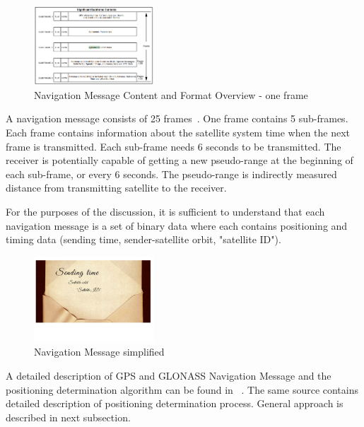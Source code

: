 \documentclass[a4paper,twoside,12pt]{memoir} %
\begin{document}
	\begin{figure}[H]
		\centering
		\includegraphics[width=0.4\textwidth]{NACONTENT}
		\caption{Navigation Message Content and Format Overview - one frame \cite{GPS:1}}
		\label{Fig:aaa}
	\end{figure}
	
	A navigation message consists of 25 frames~\cite{bookProcessing}.
	One frame contains 5 sub-frames.
	Each frame contains information about the satellite system time when the next frame is transmitted. 
	Each sub-frame needs 6 seconds to be transmitted.
	The receiver is potentially capable of getting a new pseudo-range at the beginning of each sub-frame, or every 6 
	seconds. 
	The pseudo-range is indirectly measured distance from transmitting satellite to the receiver.
	
	For the purposes of the discussion, it is sufficient to understand that each navigation message is a set of 
	binary data where each contains positioning and timing data (sending time, sender-satellite orbit, "satellite ID").
	\begin{figure}[H]
		\centering
		\includegraphics[width=0.4\textwidth]{message}
		\caption{Navigation Message simplified}
		\label{Fig:na}
	\end{figure}
	
	A detailed description of GPS and GLONASS Navigation Message and the positioning determination algorithm can be found in  ~\cite{bookProcessing}. The same source contains detailed description of positioning determination process. General approach is described in next subsection.
	
\end{document}
